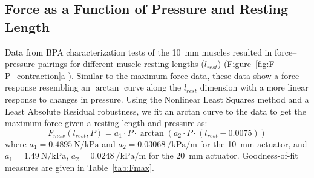 \documentclass[actuators,article,accept,pdftex,moreauthors]{Definitions/mdpi}
\begin{document}

\subsection{Force as a Function of Pressure and Resting Length}

Data from BPA characterization tests of the \qty{10}{\mm} muscles resulted in force--pressure pairings for different muscle resting lengths ($l_{rest}$) (Figure~\ref{fig:F-P_contraction}{a}%
). Similar to the maximum force data, these data show a force response resembling an $\arctan$ curve along the $l_{rest}$ dimension  with a more linear response to changes in pressure. Using the Nonlinear Least Squares method and a Least Absolute Residual robustness, we fit an arctan curve to the data to get the maximum force given a resting length and pressure as:
\begin{equation}
    F_{max}(l_{rest},P) = a_1 \cdot P \cdot \arctan{(a_2 \cdot P \cdot (l_{rest}-0.0075))} \label{eq:Fmax_3D}
\end{equation}
where $a_1 = \qty{0.4895}{\N\per\kPa}$  and $a_2=\qty{0.03068}{\per\kPa\per\m}$ for the \qty{10}{\mm} actuator, and \mbox{$a_1 = \qty{1.49}{\N\per\kPa}$,} $a_2=\qty{0.0248}{\per\kPa\per\m}$ for the \qty{20}{\mm} actuator. Goodness-of-fit measures are given in Table~\ref{tab:Fmax}. 
\end{document}
